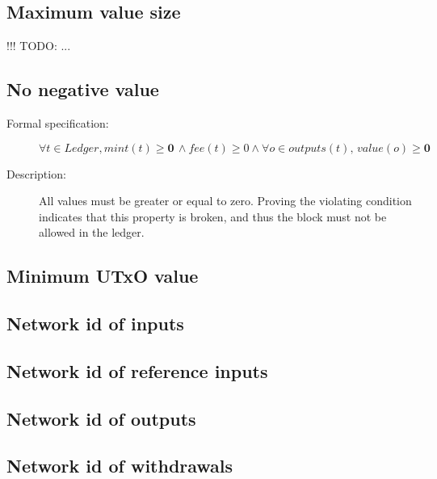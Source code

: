 \documentclass[../midgard.tex]{subfiles}
\begin{document}
\subsection{Maximum value size}

!!! TODO: ...

\subsection{No negative value}

\begin{description}

\item[Formal specification:]
\begin{equation*}
    \forall t \in Ledger, mint(t) \geq \mathbf{0} \, \land fee(t) \geq 0 \land \forall o \in outputs(t), \, value(o) \geq \mathbf{0}
\end{equation*}
                
\item[Description:] All values must be greater or equal to zero.
  Proving the violating condition indicates that this property is broken, and thus the block must not be allowed in the ledger.
        
\end{description}


\subsection{Minimum UTxO value}

\subsection{Network id of inputs}

\subsection{Network id of reference inputs}


\subsection{Network id of outputs}

\subsection{Network id of withdrawals}
\end{document}
